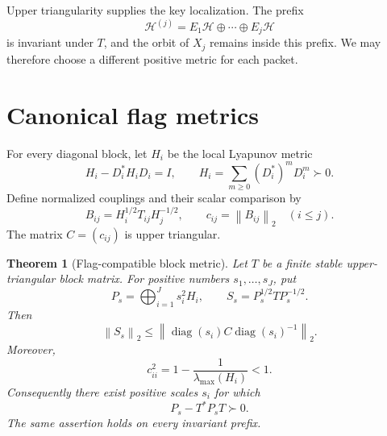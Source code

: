 \documentclass[11pt]{article}
\newtheorem{theorem}{Theorem}[section]
\theoremstyle{remark}
\newcommand{\norm}[1]{\left\lVert#1\right\rVert}
\newcommand{\diag}{\operatorname{diag}}
\begin{document}
Upper triangularity supplies the key localization.  The prefix
\begin{equation}
 \mathcal H^{(j)}=E_1\mathcal H\oplus\cdots\oplus E_j\mathcal H
 \label{eq:prefix}
\end{equation}
is invariant under $T$, and the orbit of $X_j$ remains inside this prefix.
We may therefore choose a different positive metric for each packet.

\section{Canonical flag metrics}
\label{sec:flag}

For every diagonal block, let $H_i$ be the local Lyapunov metric
\citep{LancasterRodman1995,ZhouDoyleGlover1996}
\begin{equation}
 H_i-D_i^*H_iD_i=I,
 \qquad
 H_i=\sum_{m\ge0}(D_i^*)^mD_i^m\succ0.
 \label{eq:local-metric}
\end{equation}
Define normalized couplings and their scalar comparison by
\begin{equation}
 B_{ij}=H_i^{1/2}T_{ij}H_j^{-1/2},
 \qquad c_{ij}=\norm{B_{ij}}_2
 \quad(i\le j).
 \label{eq:normalized-blocks}
\end{equation}
The matrix $C=(c_{ij})$ is upper triangular.

\begin{theorem}[Flag-compatible block metric]
\label{thm:flag-metric}
Let $T$ be a finite stable upper-triangular block matrix.  For positive
numbers $s_1,\ldots,s_J$, put
\begin{equation}
 P_s=\bigoplus_{i=1}^Js_i^2H_i,
 \qquad S_s=P_s^{1/2}TP_s^{-1/2}.
 \label{eq:scaled-metric}
\end{equation}
Then
\begin{equation}
 \norm{S_s}_2
 \le
 \norm{\diag(s_i)C\diag(s_i)^{-1}}_2.
 \label{eq:comparison}
\end{equation}
Moreover,
\begin{equation}
 c_{ii}^2=1-\frac{1}{\lambda_{\max}(H_i)}<1.
 \label{eq:local-contraction}
\end{equation}
Consequently there exist positive scales $s_i$ for which
\begin{equation}
 P_s-T^*P_sT\succ0.
 \label{eq:flag-dissipation}
\end{equation}
The same assertion holds on every invariant prefix.
\end{theorem}
\end{document}
